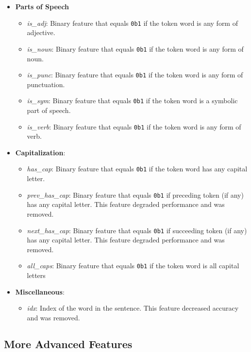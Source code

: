 \documentclass{article}
\begin{document}
  \begin{itemize}
    \item \textbf{Parts of Speech}
      \begin{itemize}
        \item \textit{is\_adj}: Binary feature that equals \texttt{0b1} if the token word is any form of adjective.
        \item \textit{is\_noun}: Binary feature that equals \texttt{0b1} if the token word is any form of noun.
        \item \textit{is\_punc}: Binary feature that equals \texttt{0b1} if the token word is any form of punctuation.
        \item \textit{is\_sym}: Binary feature that equals \texttt{0b1} if the token word is a symbolic part of speech.
        \item \textit{is\_verb}: Binary feature that equals \texttt{0b1} if the token word is any form of verb.
      \end{itemize}
    \item \textbf{Capitalization}:
      \begin{itemize}
        \item \textit{has\_cap}: Binary feature that equals \texttt{0b1} if the token word has any capital letter.
        \item \textit{prev\_has\_cap}: Binary feature that equals \texttt{0b1} if preceding token (if any) has any capital letter. This feature degraded performance and was removed.
        \item \textit{next\_has\_cap}: Binary feature that equals \texttt{0b1} if succeeding token (if any) has any capital letter. This feature degraded performance and was removed.
        \item \textit{all\_caps}: Binary feature that equals \texttt{0b1} if the token word is all capital letters
      \end{itemize}
    \item \textbf{Miscellaneous}:
      \begin{itemize}
        \item \textit{idx}: Index of the word in the sentence.  This feature decreased accuracy and was removed.
      \end{itemize}
  \end{itemize}

  \subsection{More Advanced Features}
\end{document}
